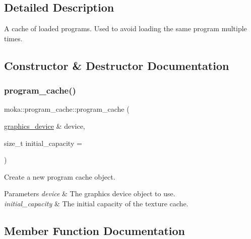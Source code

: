 \subsection{Detailed Description}
A cache of loaded programs. Used to avoid loading the same program multiple times. 

\subsection{Constructor \& Destructor Documentation}
\mbox{\label{classmoka_1_1program__cache_a2923d728c124b123d4d61ed0ba2860e8}} 
\subsubsection{\texorpdfstring{program\_cache()}{program\_cache()}}
{\footnotesize\ttfamily moka\+::program\+\_\+cache\+::program\+\_\+cache (\begin{DoxyParamCaption}\item[{\mbox{\hyperlink{classmoka_1_1graphics__device}{graphics\+\_\+device}} \&}]{device,  }\item[{size\+\_\+t}]{initial\+\_\+capacity = {} }\end{DoxyParamCaption})\hspace{0.3cm}{\ttfamily [explicit]}}



Create a new program cache object. 


\begin{DoxyParams}{Parameters}
{\em device} & The graphics device object to use. \\
\hline
{\em initial\+\_\+capacity} & The initial capacity of the texture cache. \\
\hline
\end{DoxyParams}


\subsection{Member Function Documentation}
\mbox{\label{classmoka_1_1program__cache_a9eeca1026c37479e73f2b9affdc160d2}} 
